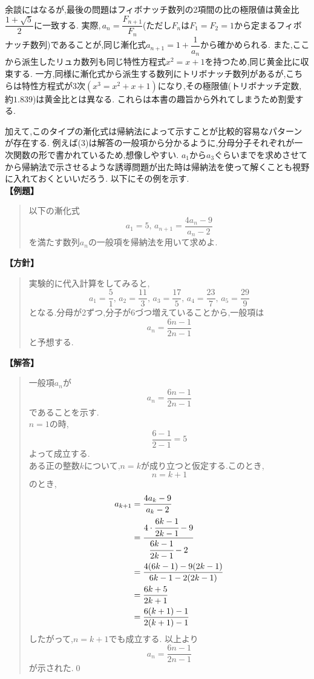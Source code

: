  余談にはなるが,最後の問題はフィボナッチ数列の2項間の比の極限値は黄金比$\dfrac{1+\sqrt{5}}{2}$に一致する.
  実際,\,$a_n=\dfrac{F_{n+1}}{F_n}$(ただし$F_n$は$F_1=F_2=1$から定まるフィボナッチ数列)であることが,同じ漸化式$a_{n+1}=1+\dfrac1{a_n}$から確かめられる.
  また,ここから派生したリュカ数列も同じ特性方程式$x^2=x+1$を持つため,同じ黄金比に収束する.
  一方,同様に漸化式から派生する数列にトリボナッチ数列があるが,こちらは特性方程式が3次$(x^3=x^2+x+1)$になり,その極限値(トリボナッチ定数,約$1.839$)は黄金比とは異なる.
  これらは本書の趣旨から外れてしまうため割愛する.

  加えて,このタイプの漸化式は帰納法によって示すことが比較的容易なパターンが存在する.
  例えば(3)は解答の一般項から分かるように,分母分子それぞれが一次関数の形で書かれているため,想像しやすい.
  $a_1$から$a_3$ぐらいまでを求めさせてから帰納法で示させるような誘導問題が出た時は帰納法を使って解くことも視野に入れておくといいだろう.
  以下にその例を示す.\\
    \noindent\textbf{【例題】}
    \begin{quote}
      以下の漸化式
      \[
        a_1=5,\, a_{n+1}=\dfrac{4a_{n}-9}{a_{n}-2}
      \]
      を満たす数列$a_n$の一般項を帰納法を用いて求めよ.
    \end{quote}
    \textbf{【方針】}
    \begin{quote}
      実験的に代入計算をしてみると,
      \[
        a_1=\frac{5}{1},\,a_2=\frac{11}{3},\,a_3=\frac{17}{5},\,a_4=\frac{23}{7},\,a_5=\frac{29}{9}
      \]
      となる.分母が2ずつ,分子が6づつ増えていることから,一般項は
      \[
        a_n=\frac{6n-1}{2n-1}
      \]
      と予想する.
    \end{quote}
    \textbf{【解答】}
    \begin{quote}
      一般項$a_n$が
      \[
        a_n=\frac{6n-1}{2n-1}
      \]
      であることを示す.\\
      $n=1$の時,
      \[
        \frac{6-1}{2-1}=5
      \]
      よって成立する.\\
      ある正の整数$k$について,$n=k$が成り立つと仮定する.このとき,
      \[
        n=k+1
      \]
      のとき,
      \begin{align*}
        a_{k+1}&=\frac{4a_{k}-9}{a_{k}-2}\\
        &=\cfrac{4\cdot \cfrac{6k-1}{2k-1}-9}{\cfrac{6k-1}{2k-1}-2}\\
        &=\frac{4(6k-1)-9(2k-1)}{6k-1-2(2k-1)}\\
        &=\frac{6k+5}{2k+1}\\
        &=\frac{6(k+1)-1}{2(k+1)-1}
      \end{align*}
      したがって,$n=k+1$でも成立する.
      以上より
      \[
        a_n=\frac{6n-1}{2n-1}
      \]
      が示された.\qed

  \end{quote}

